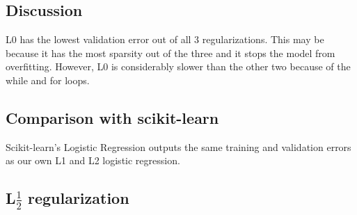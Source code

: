 \documentclass{article}
\begin{document}
\subsection{Discussion}
L0 has the lowest validation error out of all 3 regularizations. This may be because it has the most sparsity out of 
the three and it stops the model from overfitting. However, L0 is considerably slower than the other two because of the
while and for loops.

\subsection{Comparison with scikit-learn}
Scikit-learn's Logistic Regression outputs the same training and validation errors as our own L1 and L2 logistic regression.

\subsection{L$\frac12$ regularization}
\end{document}
